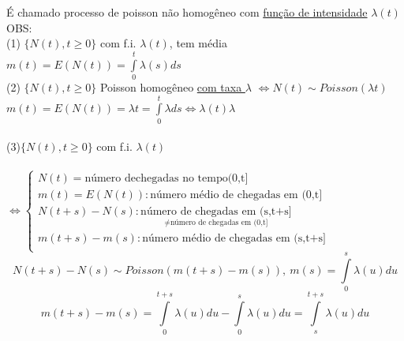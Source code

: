 \documentclass[a4paper,12pt]{article}
\begin{document}
  \'E chamado processo de poisson não homogêneo com \underline{função de intensidade} $\lambda(t)$
 \\
 OBS:
\\
(1) $\{N(t),t\ge0\}$  com f.i. $\lambda(t)$, tem m\'edia $m(t)=E(N(t))=\int\limits_{0}^{t}\lambda(s)ds$
\\
(2)  $\{N(t),t\ge0\}$  Poisson homogêneo \underline{com taxa $\lambda$} $\iff N(t)\sim Poisson(\lambda t)$\\
 $m(t)=E(N(t))=\lambda t=\int\limits_{0}^{t}\lambda ds\iff\lambda(t)\lambda$\\
 \\
 (3)$\{N(t),t\ge0\}$  com f.i. $\lambda(t)$\\
 \\
 $\iff \begin{cases*}
 N(t)=\text{número dechegadas no tempo(0,t]}\\
 m(t)=E(N(t)):\text{número médio de chegadas em (0,t]}\\
 N(t+s)-N(s):\underset{\ne \text{número de chegadas em (0,t]}}{\text{número de chegadas em (s,t+s]}}\\
  m(t+s)-m(s):\text{número médio de chegadas em (s,t+s]}\\
 \end{cases*}
 $
 \\
 $$N(t+s)-N(s)\sim Poisson\left(m(t+s)-m(s)\right), \ m(s)=\int\limits_{0}^s\lambda(u)du $$
 $$m(t+s)-m(s)=\int\limits_0^{t+s}\lambda(u)du-\int\limits_0^{s}\lambda(u)du=\int\limits_s^{t+s}\lambda(u)du $$
 
\end{document}
